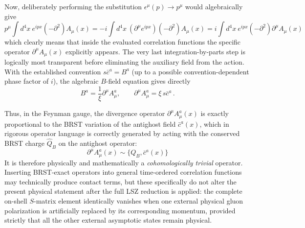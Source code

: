 Now, deliberately performing the substitution \(\epsilon^\mu(p) \rightarrow p^\mu\) would algebraically give
\begin{equation} \label{eq:longitudinal_substitution}
    p^\mu \int d^4x \ e^{ipx}(-\partial^2)A_\mu(x) = -i \int d^4x \ (\partial^\mu e^{ipx})(-\partial^2)A_\mu(x) = i \int d^4x \ e^{ipx}(-\partial^2)\partial^\mu A_\mu(x)
\end{equation}
which clearly means that inside the evaluated correlation functions the specific operator \(\partial^\mu A_\mu(x)\) explicitly appears. The very last integration-by-parts step is logically most transparent before eliminating the auxiliary field from the action. With the established convention \(s\bar{c}^a = B^a\) (up to a possible convention-dependent phase factor of \(i\)), the algebraic \(B\)-field equation gives directly
\begin{equation} \label{eq:b_field_divergence}
    B^a = \frac{1}{\xi}\partial^\mu A_\mu^a, \qquad \partial^\mu A_\mu^a = \xi \, s\bar{c}^a \, .
\end{equation}

Thus, in the Feynman gauge, the divergence operator \(\partial^\mu A_\mu^a(x)\) is exactly proportional to the BRST variation of the antighost field \(\bar{c}^a(x)\), which in rigorous operator language is correctly generated by acting with the conserved BRST charge \(\hat{Q}_B\) on the antighost operator:
\begin{equation} \label{eq:brst_exact_divergence}
    \partial^\mu A_\mu^a(x) \sim \{Q_B, \bar{c}^a(x)\}
\end{equation}
It is therefore physically and mathematically a \textit{cohomologically trivial} operator. Inserting BRST-exact operators into general time-ordered correlation functions may technically produce contact terms, but these specifically do not alter the present physical statement after the full LSZ reduction is applied: the complete on-shell \(S\)-matrix element identically vanishes when one external physical gluon polarization is artificially replaced by its corresponding momentum, provided strictly that all the other external asymptotic states remain physical.